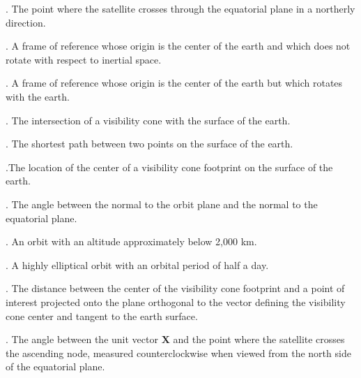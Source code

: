 \documentclass[oneside,12pt]{report}
\begin{document}
\vspace{12pt} 

\vspace{8pt}
. The point where the satellite crosses through
the equatorial plane in a northerly direction. 

\vspace{8pt}
. A frame of reference whose origin is the center of the earth and which does not rotate with respect to inertial space.

\vspace{8pt}
. A frame of reference whose origin is the center of the earth but which rotates with the earth. 

\vspace{8pt} . The intersection of a visibility cone with the surface of the earth.

\vspace{8pt} . The shortest path between two points on the surface of the earth. 

\vspace{8pt} .The location of the center of a visibility cone footprint on the surface of the earth.

\vspace{8pt}
.  The angle between the normal to the orbit plane
and the normal to the equatorial plane.

\vspace{8pt} . An orbit with an altitude approximately below 2,000 km.

\vspace{8pt} . A highly elliptical orbit with an orbital period of half a day.

\vspace{8pt} . The distance between the center of the visibility cone footprint and a point of interest projected onto the plane orthogonal to the vector defining the visibility cone center and tangent to the earth surface.

\vspace{8pt}
. The angle
between the unit vector $\bm{X}$ and the point where the satellite crosses the
ascending node, measured counterclockwise when viewed from the north side of
the equatorial plane.
\end{document}
